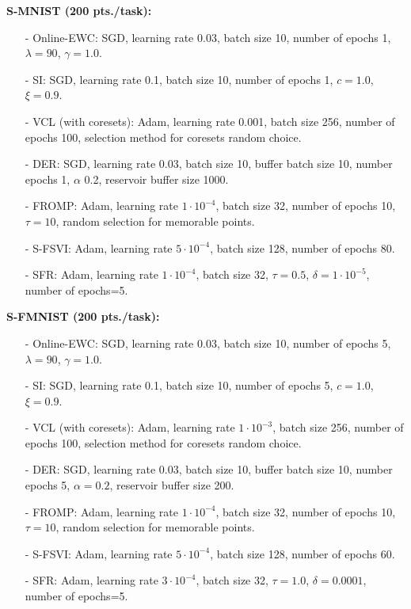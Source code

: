 \documentclass{article}
\begin{document}
\textbf{S-MNIST (200 pts./task):}
\begin{itemize}
	\item[-] Online-EWC: SGD, learning rate $0.03$, batch size  10, number of epochs 1, $\lambda=90$, $\gamma=1.0$.
	\item[-] SI: SGD, learning rate 0.1, batch size 10, number of epochs 1, $c=1.0$, $\xi=0.9$.
	\item[-] VCL (with coresets): Adam, learning rate 0.001, batch size 256, number of epochs 100, selection method for coresets random choice.
	\item[-] DER: SGD, learning rate 0.03, batch size 10, buffer batch size 10, number epochs 1, $\alpha$ 0.2, reservoir buffer size 1000.
	\item[-] FROMP: Adam, learning rate $1 \cdot 10^{-4}$, batch size 32, number of epochs 10, $\tau = 10$, random selection for memorable points.
	\item[-] S-FSVI: Adam, learning rate $5 \cdot 10^{-4}$, batch size 128, number of epochs 80.
	\item[-] SFR: Adam, learning rate $1 \cdot 10^{-4}$, batch size 32, $\tau=0.5$, $\delta=1 \cdot 10^{-5}$, number of epochs=5.
\end{itemize}
 
\textbf{S-FMNIST (200 pts./task):}
\begin{itemize}
	\item[-] Online-EWC: SGD, learning rate $0.03$, batch size  10, number of epochs 5, $\lambda=90$, $\gamma=1.0$.
	\item[-] SI: SGD, learning rate 0.1, batch size 10, number of epochs 5, $c=1.0$, $\xi=0.9$.
	\item[-] VCL (with coresets): Adam, learning rate $1 \cdot 10^{-3}$, batch size 256, number of epochs 100, selection method for coresets random choice.
	\item[-] DER: SGD, learning rate 0.03, batch size 10, buffer batch size 10, number epochs 5, $\alpha =  0.2$, reservoir buffer size 200.
	\item[-] FROMP: Adam, learning rate $1 \cdot 10^{-4}$, batch size 32, number of epochs 10, $\tau = 10$, random selection for memorable points.
	\item[-] S-FSVI: Adam, learning rate $5 \cdot 10^{-4}$, batch size 128, number of epochs 60.
	\item[-] SFR: Adam, learning rate $3 \cdot 10^{-4}$, batch size 32, $\tau=1.0$, $\delta=0.0001$, number of epochs=5.
\end{itemize}
\end{document}
